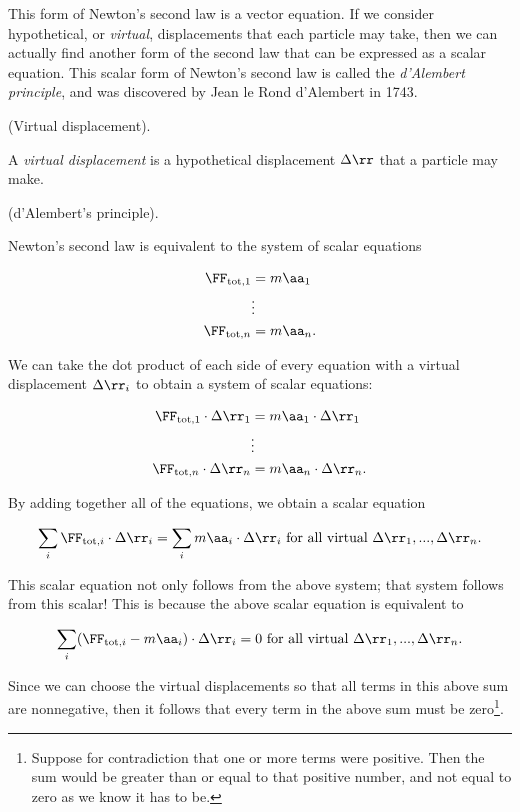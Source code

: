 \documentclass{article}
\begin{document}
This form of Newton's second law is a vector equation. If we consider hypothetical, or \textit{virtual}, displacements that each particle may take, then we can actually find another form of the second law that can be expressed as a scalar equation. This scalar form of Newton's second law is called the \textit{d'Alembert principle}, and was discovered by Jean le Rond d'Alembert in 1743.

\begin{defn}
    (Virtual displacement).

    A \textit{virtual displacement} is a hypothetical displacement $\Delta \rr$ that a particle may make.
\end{defn}

\begin{deriv}
    (d'Alembert's principle).

    Newton's second law is equivalent to the system of scalar equations

    \begin{align*}
        \FF_{\text{tot}, 1} &= m\aa_1 \\
        &\vdots \\
        \FF_{\text{tot}, n} &= m\aa_n.
    \end{align*}

    We can take the dot product of each side of every equation with a virtual displacement $\Delta \rr_i$ to obtain a system of scalar equations:

    \begin{align*}
        \FF_{\text{tot}, 1} \cdot \Delta \rr_1 &= m\aa_1 \cdot \Delta \rr_1 \\
        &\vdots \\
        \FF_{\text{tot}, n} \cdot \Delta \rr_n &= m\aa_n \cdot \Delta \rr_n.
    \end{align*}

    By adding together all of the equations, we obtain a scalar equation

    \begin{align*}
        \sum_i \FF_{\text{tot},i} \cdot \Delta \rr_i = \sum_i m\aa_i \cdot \Delta \rr_i \text{ for all virtual $\Delta \rr_1, ..., \Delta \rr_n$}.
    \end{align*}

    This scalar equation not only follows from the above system; that system follows from this scalar! This is because the above scalar equation is equivalent to

    \begin{align*}
        \sum_i (\FF_{\text{tot},i} - m\aa_i) \cdot \Delta \rr_i = 0 \text{ for all virtual $\Delta \rr_1, ..., \Delta \rr_n$}.
    \end{align*}

    Since we can choose the virtual displacements so that all terms in this above sum are nonnegative, then it follows that every term in the above sum must be zero\footnote{Suppose for contradiction that one or more terms were positive. Then the sum would be greater than or equal to that positive number, and not equal to zero as we know it has to be.}.
\end{deriv}
\end{document}
